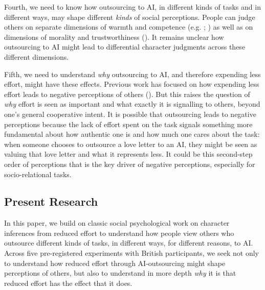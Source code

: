 \documentclass[
  man,
  floatsintext,
  longtable,
  nolmodern,
  notxfonts,
  notimes,
  colorlinks=true,linkcolor=blue,citecolor=blue,urlcolor=blue]{apa7}
\begin{document}
Fourth, we need to know how outsourcing to AI, in different kinds of
tasks and in different ways, may shape different \emph{kinds} of social
perceptions. People can judge others on separate dimensions of warmth
and competence (e.g. ;
) as well as on
dimensions of morality and trustworthiness
(). It remains unclear
how outsourcing to AI might lead to differential character judgments
across these different dimensions.

Fifth, we need to understand \emph{why} outsourcing to AI, and therefore
expending less effort, might have these effects. Previous work has
focused on how expending less effort leads to negative perceptions of
others (). But this
raises the question of \emph{why} effort is seen as important and what
exactly it is signalling to others, beyond one's general cooperative
intent. It is possible that outsourcing leads to negative perceptions
because the lack of effort spent on the task signals something more
fundamental about how authentic one is and how much one cares about the
task: when someone chooses to outsource a love letter to an AI, they
might be seen as valuing that love letter and what it represents less.
It could be this second-step order of perceptions that is the key driver
of negative perceptions, especially for socio-relational tasks.

\subsection*{Present Research}\label{present-research}

In this paper, we build on classic social psychological work on
character inferences from reduced effort to understand how people view
others who outsource different kinds of tasks, in different ways, for
different reasons, to AI. Across five pre-registered experiments with
British participants, we seek not only to understand how reduced effort
through AI-outsourcing might shape perceptions of others, but also to
understand in more depth \emph{why} it is that reduced effort has the
effect that it does.
\end{document}
